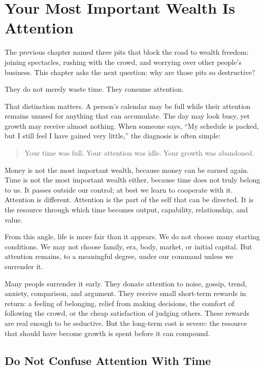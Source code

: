 \chapter{Your Most Important Wealth Is Attention}

The previous chapter named three pits that block the road to wealth freedom: joining spectacles, rushing with the crowd, and worrying over other people's business. This chapter asks the next question: why are those pits so destructive?

They do not merely waste time. They consume attention.

That distinction matters. A person's calendar may be full while their attention remains unused for anything that can accumulate. The day may look busy, yet growth may receive almost nothing. When someone says, ``My schedule is packed, but I still feel I have gained very little,'' the diagnosis is often simple:

\begin{quote}
Your time was full. Your attention was idle. Your growth was abandoned.
\end{quote}

Money is not the most important wealth, because money can be earned again. Time is not the most important wealth either, because time does not truly belong to us. It passes outside our control; at best we learn to cooperate with it. Attention is different. Attention is the part of the self that can be directed. It is the resource through which time becomes output, capability, relationship, and value.

From this angle, life is more fair than it appears. We do not choose many starting conditions. We may not choose family, era, body, market, or initial capital. But attention remains, to a meaningful degree, under our command unless we surrender it.

Many people surrender it early. They donate attention to noise, gossip, trend, anxiety, comparison, and argument. They receive small short-term rewards in return: a feeling of belonging, relief from making decisions, the comfort of following the crowd, or the cheap satisfaction of judging others. These rewards are real enough to be seductive. But the long-term cost is severe: the resource that should have become growth is spent before it can compound.

\section*{Do Not Confuse Attention With Time}

